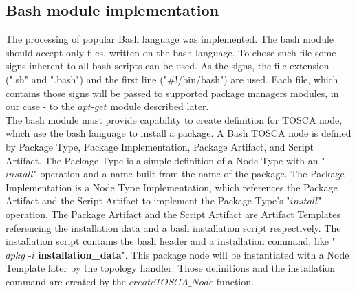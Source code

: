 \subsection*{Bash module implementation}
The processing of popular Bash language was implemented. 
The bash module should accept only files, written on the bash language.
To chose such file some signs inherent to all bash scripts can be used. 
As the signs, the file extension (".sh" and ".bash") and the first line ("\#!/bin/bash") are used. 
Each file, which contains those signs will be passed to supported package managers modules, in our case - to the $apt$-$get$ module described later. \\
The bash module must provide capability to create definition for TOSCA node, which use the bash language to install a package.
A Bash TOSCA node is defined by Package Type, Package Implementation, Package Artifact, and Script Artifact.
The Package Type is a simple definition of a Node Type with an "$install$" operation and a name built from the name of the package.
The Package Implementation is a Node Type Implementation, which references the Package Artifact and the Script Artifact to implement the Package Type's "$install$" operation.
The Package Artifact and the Script Artifact are Artifact Templates referencing the installation data and a bash installation script respectively.
The installation script contains the bash header and a installation command, like "$dpkg$ -$i$ \textbf{installation\_data}".
This package node will be instantiated with a Node Template later by the topology handler.
Those definitions and the installation command are created by the $createTOSCA\_Node$ function.

